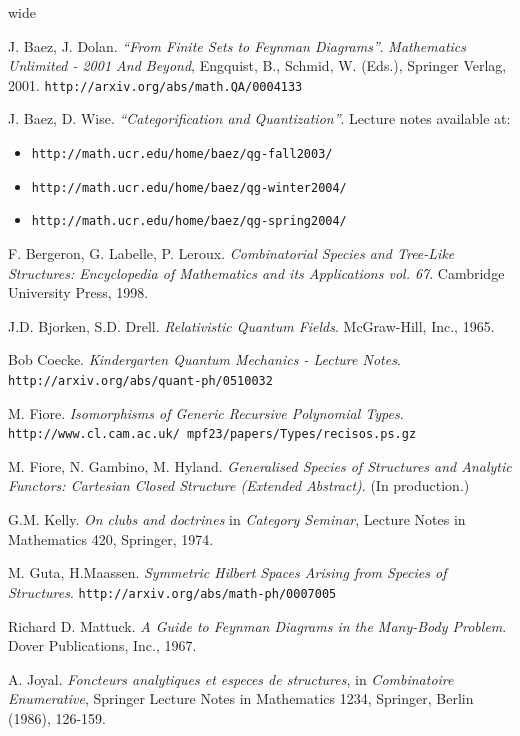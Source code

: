 \documentclass{amsart} \usepackage{amsmath,amssymb,bbm}
\begin{document}
{\pagebreak}
\begin{thebibliography}{wide}

 J. Baez, J. Dolan. {\textit{``From Finite Sets to
Feynman Diagrams''}}.  {\textit{Mathematics Unlimited - 2001 And
Beyond}}, Engquist, B., Schmid, W. (Eds.), Springer Verlag, 2001.
{\tt{http://arxiv.org/abs/math.QA/0004133}}

J. Baez, D. Wise. {\textit{``Categorification and
Quantization''}}.  Lecture notes available at:
\begin{itemize}
\item {\tt{http://math.ucr.edu/home/baez/qg-fall2003/}}
\item {\tt{http://math.ucr.edu/home/baez/qg-winter2004/}}
\item {\tt{http://math.ucr.edu/home/baez/qg-spring2004/}}
\end{itemize}

 F. Bergeron, G. Labelle,
P. Leroux. {\textit{Combinatorial Species and Tree-Like Structures:
Encyclopedia of Mathematics and its Applications vol. 67}}. Cambridge
University Press, 1998.

J.D. Bjorken, S.D. Drell. {\textit{Relativistic
Quantum Fields}}.  McGraw-Hill, Inc., 1965.

Bob Coecke. {\textit{Kindergarten Quantum Mechanics
- Lecture Notes}}.  {\tt{http://arxiv.org/abs/quant-ph/0510032}}

 M. Fiore. {\textit{Isomorphisms of Generic
Recursive Polynomial Types}}. {\tt{http://www.cl.cam.ac.uk/~mpf23/papers/Types/recisos.ps.gz}}

 M. Fiore, N. Gambino,
M. Hyland. {\textit{Generalised Species of Structures and Analytic
Functors: Cartesian Closed Structure (Extended Abstract)}}. (In
production.)

G.M. Kelly.  {\textit{On clubs and doctrines}} in
{\textit{Category Seminar}}, Lecture Notes in Mathematics 420,
Springer, 1974.

M. Guta, H.Maassen. {\textit{Symmetric Hilbert
Spaces Arising from Species of
Structures}}. {\tt{http://arxiv.org/abs/math-ph/0007005}}

Richard D. Mattuck. {\textit{A Guide to Feynman
Diagrams in the Many-Body Problem}}.  Dover Publications, Inc., 1967.

A. Joyal. {\textit{Foncteurs analytiques et especes
de structures}}, in {\textit{Combinatoire Enumerative}}, Springer
Lecture Notes in Mathematics 1234, Springer, Berlin (1986), 126-159.


\end{thebibliography}
\end{document}
